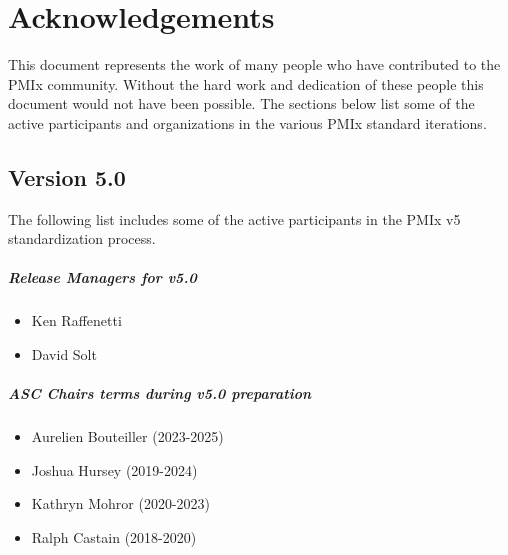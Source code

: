 \chapter{Acknowledgements}
\label{chap:acknowledgements}

This document represents the work of many people who have contributed to the PMIx community.
Without the hard work and dedication of these people this document would not have been possible.
The sections below list some of the active participants and organizations in the various PMIx standard iterations.

\section{Version 5.0}

The following list includes some of the active participants in the PMIx v5 standardization process.


\paragraph*{Release Managers for v5.0}

\begin{itemize}
    \item Ken Raffenetti
    \item David Solt
\end{itemize}

\paragraph*{ASC Chairs terms during v5.0 preparation}

\begin{itemize}
    \item Aurelien Bouteiller (2023-2025)
    \item Joshua Hursey (2019-2024)
    \item Kathryn Mohror (2020-2023)
    \item Ralph Castain (2018-2020)
\end{itemize}


